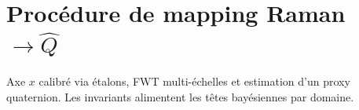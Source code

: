 
\section{Procédure de mapping Raman $\rightarrow \hat Q$}
Axe $x$ calibré via étalons, FWT multi-échelles et estimation d'un proxy quaternion. Les invariants alimentent les têtes bayésiennes par domaine.
